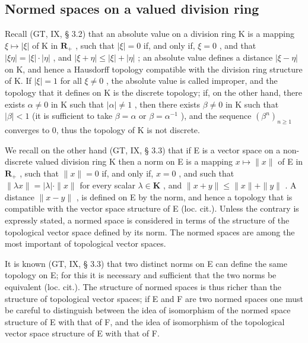 \subsection{Normed spaces on a valued division ring}

Recall (GT, IX, § 3.2) that an absolute value on a division ring K is a mapping \(\xi \mapsto |\xi|\) of K in \(\mathbf{R}_{+}\) , such that \(|\xi| = 0\) if, and only if, \(\xi = 0\) , and that \(|\xi \eta| = |\xi| \cdot |\eta|\) , and \(|\xi + \eta| \leqslant |\xi| + |\eta|\) ; an absolute value defines a distance \(|\xi - \eta|\) on K, and hence a Hausdorff topology compatible with the division ring structure of K. If \(|\xi| = 1\) for all \(\xi \neq 0\) , the absolute value is called improper, and the topology that it defines on K is the discrete topology; if, on the other hand, there exists \(\alpha \neq 0\) in K such that \(|\alpha| \neq 1\) , then there exists \(\beta \neq 0\) in K such that \(|\beta| < 1\) (it is sufficient to take \(\beta = \alpha\) or \(\beta = \alpha^{-1}\) ), and the sequence \((\beta^n)_{n \geqslant 1}\) converges to 0, thus the topology of K is not discrete.

We recall on the other hand (GT, IX, § 3.3) that if E is a vector space on a non-discrete valued division ring K then a norm on E is a mapping \(x \mapsto \|x\|\) of E in \(\mathbf{R}_{+}\) , such that \(\|x\| = 0\) if, and only if, \(x = 0\) , and such that \(\| \lambda x \| = |\lambda| \cdot \| x\|\) for every scalar \(\lambda \in \mathbf{K}\) , and \(\|x + y\| \leqslant \|x\| + \|y\|\) . A distance \(\|x - y\|\) , is defined on E by the norm, and hence a topology that is compatible with the vector space structure of E (loc. cit.). Unless the contrary is expressly stated, a normed space is considered in terms of the structure of the topological vector space defined by its norm. The normed spaces are among the most important of topological vector spaces.

It is known (GT, IX, § 3.3) that two distinct norms on E can define the same topology on E; for this it is necessary and sufficient that the two norms be equivalent (loc. cit.). The structure of normed spaces is thus richer than the structure of topological vector spaces; if E and F are two normed spaces one must be careful to distinguish between the idea of isomorphism of the normed space structure of E with that of F, and the idea of isomorphism of the topological vector space structure of E with that of F.

